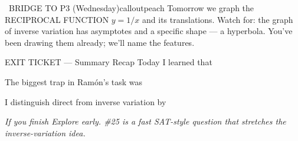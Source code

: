 \documentclass[11pt]{article}
\begin{document}
\begin{callout}{\IconSearch\ BRIDGE TO P3 (Wednesday)}{calloutpeach}
Tomorrow we graph the RECIPROCAL FUNCTION \(y = 1/x\) and its translations. Watch for: the graph of inverse variation has asymptotes and a specific shape — a hyperbola. You've been drawing them already; we'll name the features.
\end{callout}


\begin{summaryexitbox}{EXIT TICKET — Summary Recap}
Today I learned that \dotfill

The biggest trap in Ramón's task was \dotfill

I distinguish direct from inverse variation by \dotfill
\end{summaryexitbox}

\clearpage

\textit{If you finish Explore early. \#25 is a fast SAT-style question that stretches the inverse-variation idea.}

\end{document}
